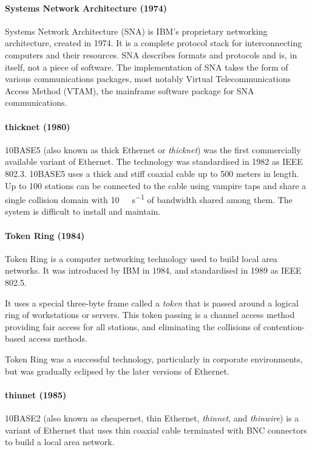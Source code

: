 {\paragraph{Systems Network Architecture (1974)}
Systems Network Architecture (SNA) is IBM's proprietary networking architecture, created in 1974.
It is a complete protocol stack for interconnecting computers and their resources.
SNA describes formats and protocols and is, in itself, not a piece of software.
The implementation of SNA takes the form of various communications packages, most notably Virtual Telecommunications Access Method (VTAM), the mainframe software package for SNA communications.
    
\paragraph{thicknet (1980)}
10BASE5 (also known as thick Ethernet or \emph{thicknet}) was the first commercially available variant of Ethernet.
The technology was standardised in 1982 as IEEE 802.3.
10BASE5 uses a thick and stiff coaxial cable up to 500 meters in length.
Up to 100 stations can be connected to the cable using vampire taps and share a single collision domain with \SI{10}{\mega\bit\per\second} of bandwidth shared among them.
The system is difficult to install and maintain.

\paragraph{Token Ring (1984)}
Token Ring is a computer networking technology used to build local area networks.
It was introduced by IBM in 1984, and standardised in 1989 as IEEE 802.5.

It uses a special three-byte frame called a \emph{token} that is passed around a logical ring of workstations or servers.
This token passing is a channel access method providing fair access for all stations, and eliminating the collisions of contention-based access methods.

Token Ring was a successful technology, particularly in corporate environments, but was gradually eclipsed by the later versions of Ethernet.

\paragraph{thinnet (1985)}
10BASE2 (also known as cheapernet, thin Ethernet, \emph{thinnet}, and \emph{thinwire}) is a variant of Ethernet that uses thin coaxial cable terminated with BNC connectors to build a local area network.

}
